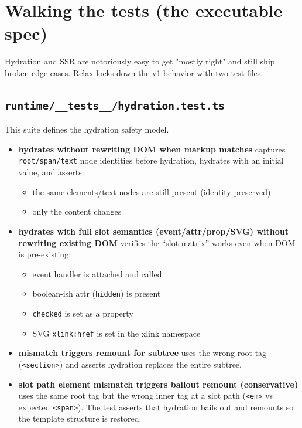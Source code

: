 \section{Walking the tests (the executable spec)}

Hydration and SSR are notoriously easy to get "mostly right" and still ship broken edge cases.
Relax locks down the v1 behavior with two test files.

\subsection{\texttt{runtime/\_\_tests\_\_/hydration.test.ts}}

This suite defines the hydration safety model.

\begin{itemize}
  \item \textbf{hydrates without rewriting DOM when markup matches}
  captures \texttt{root/span/text} node identities before hydration, hydrates with an initial value, and asserts:
  \begin{itemize}
    \item the same elements/text nodes are still present (identity preserved)
    \item only the content changes
  \end{itemize}

  \item \textbf{hydrates with full slot semantics (event/attr/prop/SVG) without rewriting existing DOM}
  verifies the “slot matrix” works even when DOM is pre-existing:
  \begin{itemize}
    \item event handler is attached and called
    \item boolean-ish attr (\texttt{hidden}) is present
    \item \texttt{checked} is set as a property
    \item SVG \texttt{xlink:href} is set in the xlink namespace
  \end{itemize}

  \item \textbf{mismatch triggers remount for subtree}
  uses the wrong root tag (\texttt{<section>}) and asserts hydration replaces the entire subtree.

  \item \textbf{slot path element mismatch triggers bailout remount (conservative)}
  uses the same root tag but the wrong inner tag at a slot path (\texttt{<em>} vs expected \texttt{<span>}).
  The test asserts that hydration bails out and remounts so the template structure is restored.
\end{itemize}


